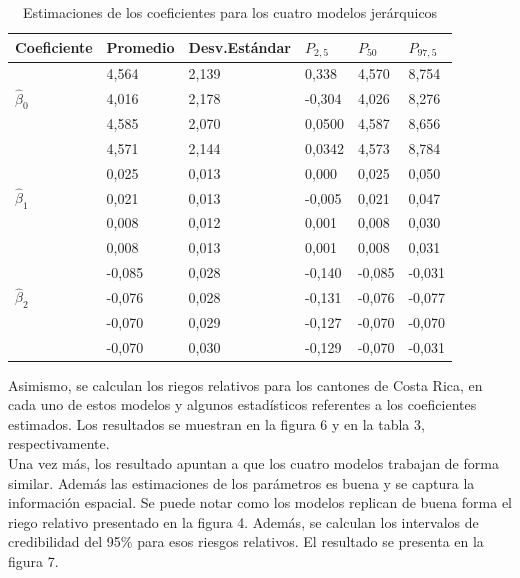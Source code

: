 \documentclass[a4paper,12pt]{report}
\begin{document}
\begin{table}[h!]
\centering
\caption{Estimaciones de los coeficientes para los cuatro modelos jerárquicos}
\begin{tabular}{llllll}
\hline
                  Coeficiente&Promedio &Desv.Estándar &$P_{2,5}$ &  $P_{50}$& $P_{97,5}$ \\ \hline
\multirow{3}{*}{$\hat{\beta}_{0}$}& 4,564& 2,139&  0,338&4,570&8,754     \\
                  & 4,016& 2,178&  -0,304&4,026&8,276 \\
                  & 4,585& 2,070&  0,0500&4,587&8,656 \\
                  & 4,571& 2,144&  0,0342&4,573&8,784\\ \hline
\multirow{3}{*}{$\hat{\beta}_{1}$}& 0,025& 0,013&  0,000&0,025&0,050     \\
                  & 0,021& 0,013&  -0,005&0,021&0,047 \\
                  & 0,008& 0,012&  0,001&0,008&0,030 \\
                 & 0,008& 0,013&  0,001&0,008&0,031\\ \hline
\multirow{3}{*}{$\hat{\beta}_{2}$}& -0,085& 0,028&  -0,140&-0,085&-0,031     \\
                  & -0,076& 0,028&  -0,131&-0,076&-0,077   \\
                  & -0,070& 0,029&  -0,127&-0,070&-0,070   \\
                 & -0,070& 0,030&  -0,129&-0,070&-0,031 \\ \hline
\end{tabular}
\end{table}

 Asimismo, se calculan los riegos relativos para los cantones de Costa Rica, en cada uno de estos modelos y algunos estadísticos referentes a los coeficientes estimados. Los resultados se muestran en la figura 6 y en la tabla 3, respectivamente.\\
Una vez más, los resultado apuntan a que los cuatro modelos trabajan de forma similar. Además las estimaciones de los parámetros es buena y se captura la información espacial. Se puede notar como los modelos replican de buena forma el riego relativo presentado en la figura 4. Además, se calculan los intervalos de credibilidad del 95\% para esos riesgos relativos. El resultado se presenta en la figura 7.
\end{document}
